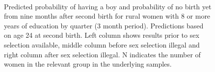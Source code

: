 \documentclass[12pt,letterpaper]{article}
\begin{document}
\begin{figure}[htpb]
{\begin{minipage}{0.31\textwidth}
        \\
        \captionsetup[subfigure]{labelformat=parens}
    \end{minipage}
}
\setcounter{subfigure}{3}
\caption{Predicted probability of having a boy and probability of
no birth yet from nine months after second birth for rural
women with 8 or more years of education by quarter (3 month period). 
Predictions based on age 24 at second birth.
Left column shows results prior to sex selection available, middle column before
sex selection illegal and right column after sex selection illegal.
N indicates the number of women in the relevant group in the underlying samples.
}
\label{fig:results_spell3_high_rural}
\end{figure}
\end{document}
